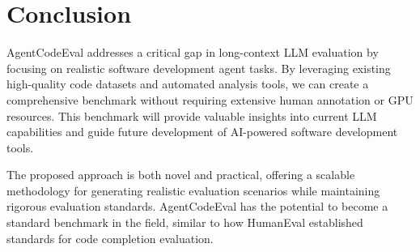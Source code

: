 \documentclass{article}
\begin{document}
\section{Conclusion}

AgentCodeEval addresses a critical gap in long-context LLM evaluation by focusing on realistic software development agent tasks. By leveraging existing high-quality code datasets and automated analysis tools, we can create a comprehensive benchmark without requiring extensive human annotation or GPU resources. This benchmark will provide valuable insights into current LLM capabilities and guide future development of AI-powered software development tools.

The proposed approach is both novel and practical, offering a scalable methodology for generating realistic evaluation scenarios while maintaining rigorous evaluation standards. AgentCodeEval has the potential to become a standard benchmark in the field, similar to how HumanEval established standards for code completion evaluation.
\end{document}
